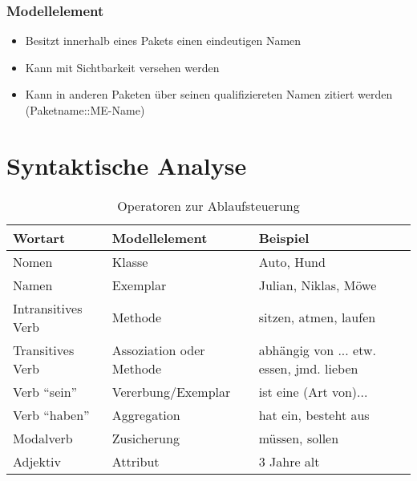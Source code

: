 \subsubsection{Modellelement}
\begin{itemize}
    \item Besitzt innerhalb eines Pakets einen eindeutigen Namen
    \item Kann mit Sichtbarkeit versehen werden
    \item Kann in anderen Paketen über seinen qualifiziereten Namen zitiert werden (Paketname::ME-Name)
\end{itemize}


\section{Syntaktische Analyse}
\begin{table}[h]
\begin{tabular}{l|l|l}
Wortart            & Modellelement            & Beispiel                                 \\
\hline
Nomen              & Klasse                   & Auto, Hund                               \\
Namen              & Exemplar                 & Julian, Niklas, Möwe                     \\
Intransitives Verb & Methode                  & sitzen, atmen, laufen                    \\
Transitives Verb   & Assoziation oder Methode & abhängig von ... etw. essen, jmd. lieben \\
Verb ``sein''      & Vererbung/Exemplar       & ist eine (Art von)...                    \\
Verb ``haben''     & Aggregation              & hat ein, besteht aus                     \\
Modalverb          & Zusicherung              & müssen, sollen                           \\
Adjektiv           & Attribut                 & 3 Jahre alt               
\end{tabular}
\caption{Operatoren zur Ablaufsteuerung}
\label{tab:ablaufsteuerung}
\end{table}

